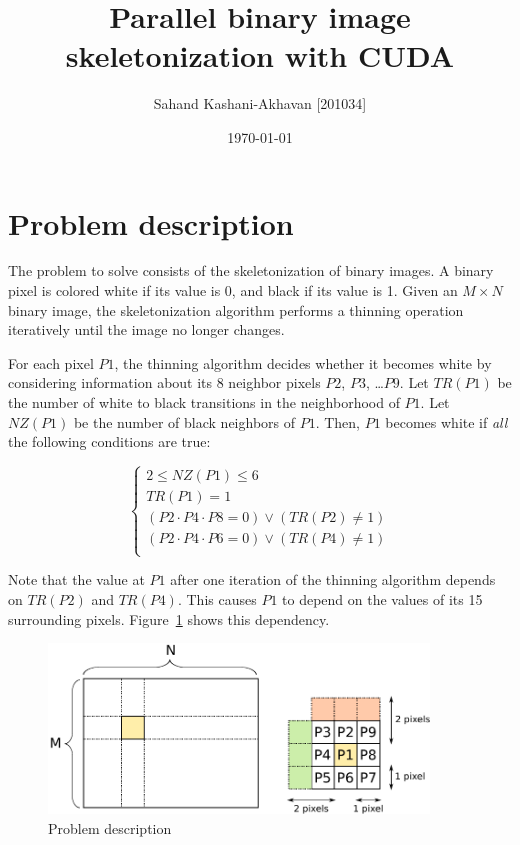 \documentclass[11pt,a4paper]{article}
\title{Parallel binary image skeletonization with CUDA}
\author{Sahand Kashani-Akhavan [201034]}
\date{\today}
\begin{document}
    \maketitle
    \tableofcontents
    \clearpage

    \section{Problem description}
        The problem to solve consists of the skeletonization of binary images.
        A binary pixel is colored white if its value is 0, and black if its value is 1.
        Given an $M \times N$ binary image, the skeletonization algorithm performs a thinning operation iteratively until the image no longer changes.

        For each pixel $P1$, the thinning algorithm decides whether it becomes white by considering information about its 8 neighbor pixels $P2$, $P3$, \ldots $P9$.
        Let $TR(P1)$ be the number of white to black transitions in the neighborhood of $P1$.
        Let $NZ(P1)$ be the number of black neighbors of $P1$.
        Then, $P1$ becomes white if \emph{all} the following conditions are true:

        $$
        \left\{
            \begin{array}{c}
                2 \leq NZ(P1) \leq 6                           \\
                TR(P1) = 1                                     \\
                (P2 \cdot P4 \cdot P8 = 0) \lor (TR(P2) \ne 1) \\
                (P2 \cdot P4 \cdot P6 = 0) \lor (TR(P4) \ne 1) \\
            \end{array}
        \right.
        $$

        Note that the value at $P1$ after one iteration of the thinning algorithm depends on $TR(P2)$ and $TR(P4)$. This causes $P1$ to depend on the values of its 15 surrounding pixels. Figure~\ref{fig:problem_description} shows this dependency.

        \begin{figure}[h]
            \centering
            \includegraphics[width=0.9\textwidth]{figs/problem_description}
            \caption{Problem description}
            \label{fig:problem_description}
        \end{figure}
\end{document}
